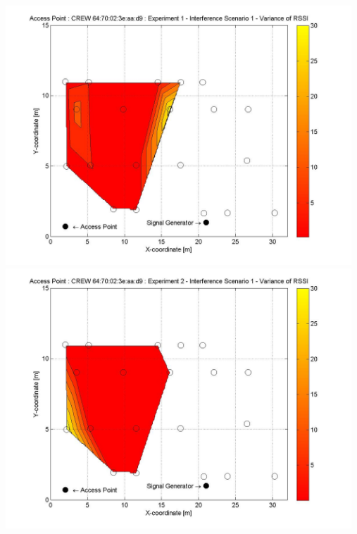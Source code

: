 \documentclass[11pt,a4paper,headinclude,footinclude,chapterprefix=on]{scrreprt}
\begin{document}
\begin{longtable}
	\includegraphics[width=13cm]{../../Source/plot/CREW_d9/d9_Sig_Ex_1_Variance.jpg} \\
	\includegraphics[width=13cm]{../../Source/plot/CREW_d9/d9_Sig_Ex_2_Variance.jpg} \\
\end{longtable}
\end{document}

